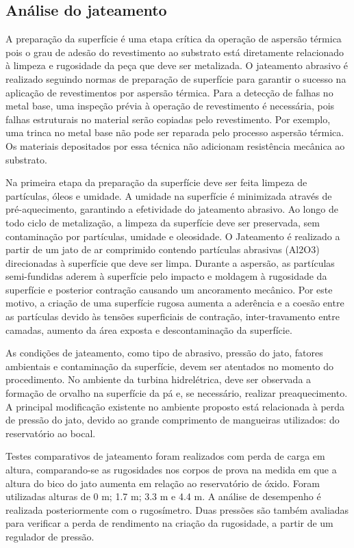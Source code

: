 \subsection{Análise do jateamento}
A preparação da superfície é uma etapa crítica da operação de aspersão térmica
pois o grau de adesão do revestimento ao substrato está diretamente relacionado
à limpeza e rugosidade da peça que deve ser metalizada. O jateamento abrasivo é
realizado seguindo normas de preparação de superfície para garantir o sucesso
na aplicação de revestimentos por aspersão térmica. Para a detecção de falhas no
metal base, uma inspeção prévia à operação de revestimento é necessária, pois
falhas estruturais no material serão copiadas pelo revestimento. Por exemplo,
uma trinca no metal base não pode ser reparada pelo processo aspersão
térmica. Os materiais depositados por essa técnica não adicionam resistência
mecânica ao substrato.

Na primeira etapa da preparação da superfície deve ser feita limpeza de
partículas, óleos e umidade. A umidade na superfície é minimizada através
de pré-aquecimento, garantindo a efetividade do jateamento abrasivo. Ao longo de
todo ciclo de metalização, a limpeza da superfície deve ser preservada, sem
contaminação por partículas, umidade e oleosidade. O Jateamento é realizado a
partir de um jato de ar comprimido contendo partículas abrasivas (Al2O3)
direcionadas à superfície que deve ser limpa. Durante a aspersão, as partículas
semi-fundidas aderem à superfície pelo impacto e moldagem à rugosidade da
superfície e posterior contração causando um ancoramento mecânico. Por este
motivo, a criação de uma superfície rugosa aumenta a aderência e a coesão entre
as partículas devido às tensões superficiais de contração, inter-travamento
entre camadas, aumento da área exposta e descontaminação da superfície.

As condições de jateamento, como tipo de abrasivo, pressão do jato, fatores
ambientais e contaminação da superfície, devem ser atentados no momento do
procedimento. No ambiente da turbina hidrelétrica, deve ser observada a
formação de orvalho na superfície da pá e, se necessário, realizar
preaquecimento. A principal modificação existente no ambiente proposto está
relacionada à perda de pressão do jato, devido ao grande comprimento de
mangueiras utilizados: do reservatório ao bocal.

Testes comparativos de jateamento foram realizados com perda de carga em
altura, comparando-se as rugosidades nos corpos de prova na medida em
que a altura do bico do jato aumenta em relação ao reservatório de óxido. Foram
utilizadas alturas de 0 m; 1.7 m; 3.3 m e 4.4 m. A análise de desempenho é
realizada posteriormente com o rugosímetro. Duas pressões são também avaliadas
para verificar a perda de rendimento na criação da rugosidade, a partir de um
regulador de pressão.

